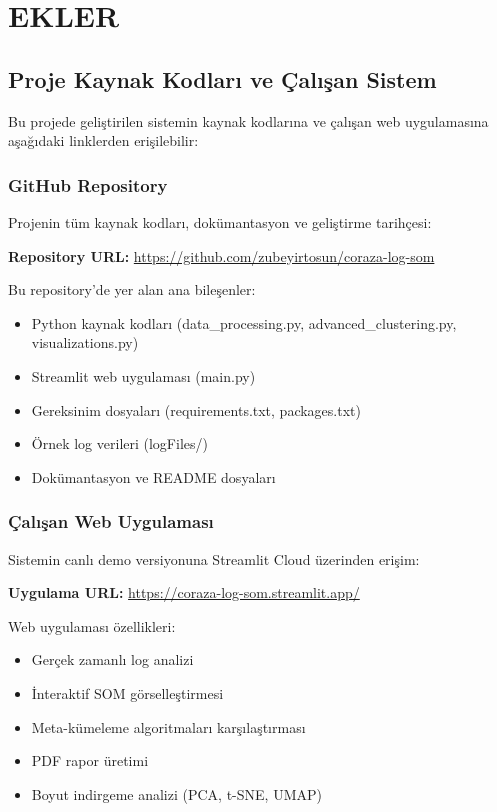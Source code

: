 \section{EKLER}

\subsection{Proje Kaynak Kodları ve Çalışan Sistem}

Bu projede geliştirilen sistemin kaynak kodlarına ve çalışan web uygulamasına aşağıdaki linklerden erişilebilir:

\subsubsection{GitHub Repository}
Projenin tüm kaynak kodları, dokümantasyon ve geliştirme tarihçesi:

\textbf{Repository URL:} \url{https://github.com/zubeyirtosun/coraza-log-som}

Bu repository'de yer alan ana bileşenler:
\begin{itemize}
    \item Python kaynak kodları (data\_processing.py, advanced\_clustering.py, visualizations.py)
    \item Streamlit web uygulaması (main.py)
    \item Gereksinim dosyaları (requirements.txt, packages.txt)
    \item Örnek log verileri (logFiles/)
    \item Dokümantasyon ve README dosyaları
\end{itemize}

\subsubsection{Çalışan Web Uygulaması}
Sistemin canlı demo versiyonuna Streamlit Cloud üzerinden erişim:

\textbf{Uygulama URL:} \url{https://coraza-log-som.streamlit.app/}

Web uygulaması özellikleri:
\begin{itemize}
    \item Gerçek zamanlı log analizi
    \item İnteraktif SOM görselleştirmesi
    \item Meta-kümeleme algoritmaları karşılaştırması
    \item PDF rapor üretimi
    \item Boyut indirgeme analizi (PCA, t-SNE, UMAP)
\end{itemize}

